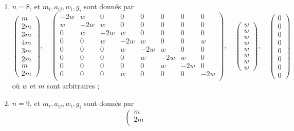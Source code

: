 \begin{lemma}[Genre un]
\begin{enumerate}
$$\right)
$$
où $w$ et $m$ sont arbitraires ;
\item
\label{item-E7-completed}
$n = 8$, et $m_i, a_{ij}, w_i, g_i$ sont donnés par
\begingroup
\small
$$
\left(
\begin{matrix}
m \\
2m \\
3m \\
4m \\
3m \\
2m \\
m \\
2m
\end{matrix}
\right),
\quad
\left(
\begin{matrix}
-2w & w & 0 & 0 & 0 & 0 & 0 & 0 \\
w & -2w & w & 0 & 0 & 0 & 0 & 0 \\
0 & w & -2w & w & 0 & 0 & 0 & 0 \\
0 & 0 & w & -2w & w & 0 & 0 & w \\
0 & 0 & 0 & w & -2w & w & 0 & 0 \\
0 & 0 & 0 & 0 & w & -2w & w & 0 \\
0 & 0 & 0 & 0 & 0 & w & -2w & 0 \\
0 & 0 & 0 & w & 0 & 0 & 0 & -2w \\
\end{matrix}
\right),
\quad
\left(
\begin{matrix}
w \\
w \\
w \\
w \\
w \\
w \\
w \\
w
\end{matrix}
\right),
\quad
\left(
\begin{matrix}
0 \\
0 \\
0 \\
0 \\
0 \\
0 \\
0 \\
0
\end{matrix}
\right)
$$
\endgroup
où $w$ et $m$ sont arbitraires ;
\item
\label{item-E8-completed}
$n = 9$, et $m_i, a_{ij}, w_i, g_i$ sont donnés par
\begingroup
\scriptsize
$$
\left(
\begin{matrix}
m \\
2m \\

\end{matrix}$$
\end{enumerate}
\end{lemma}
